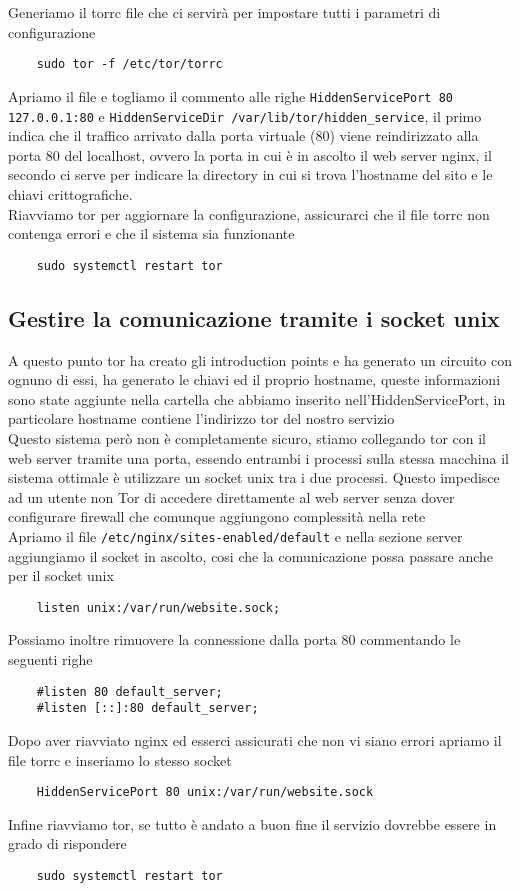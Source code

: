 Generiamo il torrc file che ci servirà per impostare tutti i parametri di configurazione 
\begin{lstlisting}
    sudo tor -f /etc/tor/torrc
\end{lstlisting}
Apriamo il file e togliamo il commento alle righe \lstinline{HiddenServicePort 80 127.0.0.1:80} e \lstinline{HiddenServiceDir /var/lib/tor/hidden_service}, il primo indica che il traffico arrivato dalla porta virtuale (80) viene reindirizzato alla porta 80 del localhost, ovvero la porta in cui è in ascolto il web server nginx, il secondo ci serve per indicare la directory in cui si trova l'hostname del sito e le chiavi crittografiche. \\
Riavviamo tor per aggiornare la configurazione, assicurarci che il file torrc non contenga errori e che il sistema sia funzionante
\begin{lstlisting}
    sudo systemctl restart tor
\end{lstlisting}

\subsection{Gestire la comunicazione tramite i socket unix}

A questo punto tor ha creato gli introduction points e ha generato un circuito con ognuno di essi, ha generato le chiavi ed il proprio hostname, queste informazioni sono state aggiunte nella cartella che abbiamo inserito nell'HiddenServicePort, in particolare hostname contiene l'indirizzo tor del nostro servizio \cite{SetupOnionService} \\
Questo sistema però non è completamente sicuro, stiamo collegando tor con il web server tramite una porta, essendo entrambi i processi sulla stessa macchina il sistema ottimale è utilizzare un socket unix tra i due processi. Questo impedisce ad un utente non Tor di accedere direttamente al web server senza dover configurare firewall che comunque aggiungono complessità nella rete \\
Apriamo il file \lstinline{/etc/nginx/sites-enabled/default} e nella sezione server aggiungiamo il socket in ascolto, cosi che la comunicazione possa passare anche per il socket unix
\begin{lstlisting}
    listen unix:/var/run/website.sock;
\end{lstlisting}
Possiamo inoltre rimuovere la connessione dalla porta 80 commentando le seguenti righe
\begin{lstlisting}
    #listen 80 default_server;
    #listen [::]:80 default_server;
\end{lstlisting}
Dopo aver riavviato nginx ed esserci assicurati che non vi siano errori apriamo il file torrc e inseriamo lo stesso socket
\begin{lstlisting}
    HiddenServicePort 80 unix:/var/run/website.sock
\end{lstlisting}
Infine riavviamo tor, se tutto è andato a buon fine il servizio dovrebbe essere in grado di rispondere
\begin{lstlisting}
    sudo systemctl restart tor
\end{lstlisting}


